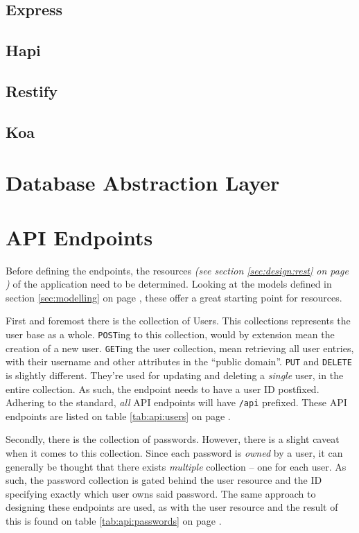 		\subsection{Express}
		\subsection{Hapi}
		\subsection{Restify}
		\subsection{Koa}


	\section{Database Abstraction Layer}

	\section{API Endpoints}
		Before defining the endpoints, the resources \emph{(see section \ref{sec:design:rest} on page \pageref{sec:design:rest})} of the application need to be determined. Looking at the models defined in section \ref{sec:modelling} on page \pageref{sec:modelling}, these offer a great starting point for resources.

		First and foremost there is the collection of Users. This collections represents the user base as a whole. \verb=POST=ing to this collection, would by extension mean the creation of a new user. \verb=GET=ing the user collection, mean retrieving all user entries, with their username and other attributes in the ``public domain''. \verb=PUT= and \verb=DELETE= is slightly different. They're used for updating and deleting a \emph{single} user, in the entire collection. As such, the endpoint needs to have a user ID postfixed. Adhering to the standard, \emph{all} API endpoints will have \verb=/api= prefixed. These API endpoints are listed on table \ref{tab:api:users} on page \pageref{tab:api:users}.

		Secondly, there is the collection of passwords. However, there is a slight caveat when it comes to this collection. Since each password is \emph{owned} by a user, it can generally be thought that there exists \emph{multiple} collection -- one for each user. As such, the password collection is gated behind the user resource and the ID specifying exactly which user owns said password. The same approach to designing these endpoints are used, as with the user resource and the result of this is found on table \ref{tab:api:passwords} on page \pageref{tab:api:passwords}.

